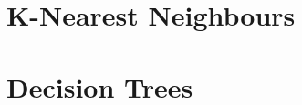 \documentclass[12pt,a4paper]{article}
\begin{document}
\section{K-Nearest Neighbours}



% 







%

%

%


\section{Decision Trees}






%
%
%
%
%
%
%
%
%

% 

% 

% 
\end{document}
